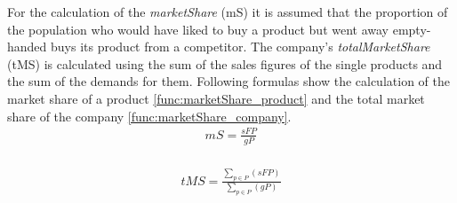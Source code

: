 For the calculation of the \textit{marketShare} (\gls{mS}) it is assumed that the proportion of the population who would have liked to buy a product but went away empty-handed buys its product from a competitor. The company's \textit{totalMarketShare} (\gls{tMS}) is calculated using the sum of the sales figures of the single products and the sum of the demands for them. Following formulas show the calculation of the market share of a product \ref{func:marketShare_product} and the total market share of the company \ref{func:marketShare_company}. 
\begin{equation}
\label{func:marketShare_product} 
\begin{aligned}
mS = \frac{sFP}{gP} \\
\end{aligned}
\end{equation}

\begin{equation}
\label{func:marketShare_company}
\begin{aligned}
tMS = \frac{\sum_{p \in P}(sFP)}{\sum_{p \in P}(gP)}  
\end{aligned}
\end{equation}

